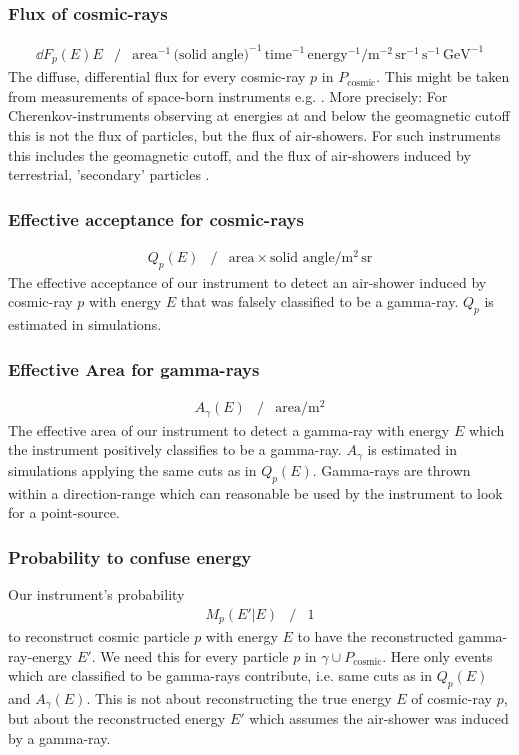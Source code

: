 \documentclass{article}%
\begin{document}
\subsubsection*{Flux of cosmic-rays}
%
\begin{eqnarray*}
\dd{F_p(E)}{E} &/&
\text{area}^{-1}\,\text{(solid angle)}^{-1}\,\text{time}^{-1}\,\text{energy}^{-1} /
\text{m}^{-2}\,\text{sr}^{-1}\,\text{s}^{-1}\,\text{GeV}^{-1}
\end{eqnarray*}
The diffuse, differential flux for every cosmic-ray $p$ in $P_\text{cosmic}$. This might be taken from measurements of space-born instruments e.g. \cite{aguilar2014precision,aguilar2015precision}.
%
More precisely: For Cherenkov-instruments observing at energies at and below the geomagnetic cutoff this is not the flux of particles, but the flux of air-showers.
%
For such instruments this includes the geomagnetic cutoff, and the flux of air-showers induced by terrestrial, 'secondary' particles \cite{lipari2002fluxes}.
%
\subsubsection*{Effective acceptance for cosmic-rays}
\begin{eqnarray*}
Q_p(E) &/&
\text{area} \times{} \text{solid angle} /
\text{m}^{2}\,\text{sr}
\end{eqnarray*}
%
The effective acceptance of our instrument to detect an air-shower induced by cosmic-ray $p$ with energy $E$ that was falsely classified to be a gamma-ray.
%
$Q_p$ is estimated in simulations.
%
\subsubsection*{Effective Area for gamma-rays}
\begin{eqnarray*}
A_\gamma(E) &/&
\text{area} /
\text{m}^{2}
\end{eqnarray*}
%
The effective area of our instrument to detect a gamma-ray with energy $E$ which the instrument positively classifies to be a gamma-ray.
%
$A_\gamma$ is estimated in simulations applying the same cuts as in $Q_p(E)$.
%
Gamma-rays are thrown within a direction-range which can reasonable be used by the instrument to look for a point-source.
%
\subsubsection*{Probability to confuse energy}
%
Our instrument's probability
%
\begin{eqnarray*}
M_p(E' \vert E) &/& 1
\end{eqnarray*}
%
to reconstruct cosmic particle $p$ with energy $E$ to have the reconstructed gamma-ray-energy $E'$.
%
We need this for every particle $p$ in $\gamma \cup P_\text{cosmic}$.
%
Here only events which are classified to be gamma-rays contribute, i.e. same cuts as in $Q_p(E)$ and $A_\gamma(E)$.
%
This is not about reconstructing the true energy $E$ of cosmic-ray $p$, but about the reconstructed energy $E'$ which assumes the air-shower was induced by a gamma-ray.
%
\end{document}
